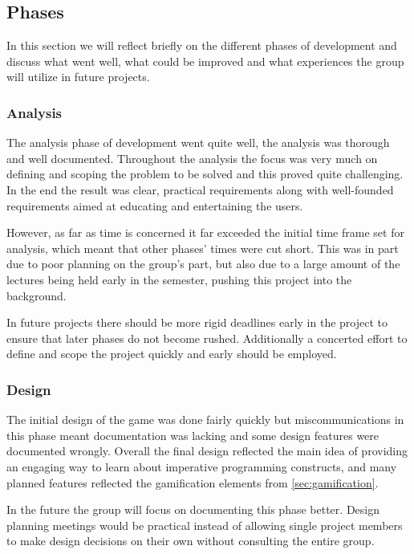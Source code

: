 \subsection{Phases}
In this section we will reflect briefly on the different phases of development and discuss what went well, what could be improved and what experiences the group will utilize in future projects.

\subsubsection{Analysis}

The analysis phase of development went quite well, the analysis was thorough and well documented. Throughout the analysis the focus was very much on defining and scoping the problem to be solved and this proved quite challenging. In the end the result was clear, practical requirements along with well-founded requirements aimed at educating and entertaining the users. 

However, as far as time is concerned it far exceeded the initial time frame set for analysis, which meant that other phases' times were cut short. This was in part due to poor planning on the group's part, but also due to a large amount of the lectures being held early in the semester, pushing this project into the background.

In future projects there should be more rigid deadlines early in the project to ensure that later phases do not become rushed. Additionally a concerted effort to define and scope the project quickly and early should be employed.

\subsubsection{Design}

The initial design of the game was done fairly quickly but miscommunications in this phase meant documentation was lacking and some design features were documented wrongly. Overall the final design reflected the main idea of providing an engaging way to learn about imperative programming constructs, and many planned features reflected the gamification elements from \autoref{sec:gamification}.

In the future the group will focus on documenting this phase better. Design planning meetings would be practical instead of allowing single project members to make design decisions on their own without consulting the entire group.

